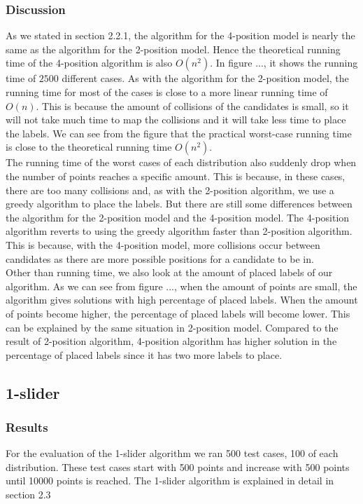 \documentclass[crop=false,a4paper,oneside,11pt]{standalone}
\begin{document}
\subsubsection{Discussion}
As we stated in section 2.2.1, the algorithm for the 4-position model is nearly the same as the algorithm for the 2-position model. Hence the theoretical running time of the 4-position algorithm is also $O(n^2)$. In figure ..., it shows the running time of $2500$ different cases. As with the algorithm for the 2-position model, the running time for most of the cases is close to a more linear running time of $O(n)$. This is because the amount of collisions of the candidates is small, so it will not take much time to map the collisions and it will take less time to place the labels. We can see from the figure that the practical worst-case running time is close to the theoretical running time $O(n^2)$. \\
The running time of the worst cases of each distribution also suddenly drop when the number of points reaches a specific amount. This is because, in these cases, there are too many collisions and, as with the 2-position algorithm, we use a greedy algorithm to place the labels. But there are still some differences between the algorithm for the 2-position model and the 4-position model. The 4-position algorithm reverts to using the greedy algorithm faster than 2-position algorithm. This is because, with the 4-position model, more collisions occur between candidates as there are more possible positions for a candidate to be in.\\
Other than running time, we also look at the amount of placed labels of our algorithm. As we can see from figure ..., when the amount of points are small, the algorithm gives solutions with high percentage of placed labels. When the amount of points become higher, the percentage of placed labels will become lower. This can be explained by the same situation in 2-position model. Compared to the result of 2-position algorithm, 4-position algorithm has higher solution in the percentage of placed labels since it has two more labels to place.\\

\subsection{1-slider}
\subsubsection{Results}
For the evaluation of the 1-slider algorithm we ran 500 test cases, 100 of each distribution. These test cases start with 500 points and increase with 500 points until 10000 points is reached. The 1-slider algorithm is explained in detail in section 2.3
\end{document}
